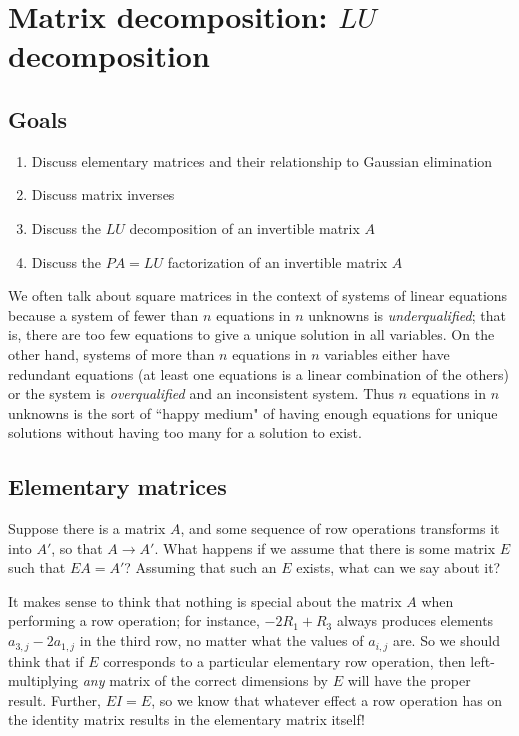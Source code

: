 \documentclass[m3380-lec-main.tex]{subfiles}
\begin{document}
\chapter{Matrix decomposition: $LU$ decomposition}

\section*{Goals}
\begin{enumerate}[1.~]\setlength{\itemsep}{0pt}
\item Discuss elementary matrices and their relationship to Gaussian elimination
\item Discuss matrix inverses
\item Discuss the $LU$ decomposition of an invertible matrix $A$
\item Discuss the $PA=LU$ factorization of an invertible matrix $A$
\end{enumerate}

\begin{rem}We often talk about square matrices in the context of systems of linear equations because a system of fewer than $n$ equations in $n$ unknowns is \emph{underqualified}; that is, there are too few equations to give a unique solution in all variables. On the other hand, systems of more than $n$ equations in $n$ variables either have redundant equations (at least one equations is a linear combination of the others) or the system is \emph{overqualified} and an inconsistent system. Thus $n$ equations in $n$ unknowns is the sort of ``happy medium" of having enough equations for unique solutions without having too many for a solution to exist.\end{rem}

\section{Elementary matrices}

Suppose there is a matrix $A$, and some sequence of row operations transforms it into $A'$, so that $A\to A'$. What happens if we assume that there is some matrix $E$ such that $EA=A'$? Assuming that such an $E$ exists, what can we say about it? 

It makes sense to think that nothing is special about the matrix $A$ when performing a row operation; for instance, $-2R_1+R_3$ always produces elements $a_{3,j}-2a_{1,j}$ in the third row, no matter what the values of $a_{i,j}$ are. So we should think that if $E$ corresponds to a particular elementary row operation, then left-multiplying \emph{any} matrix of the correct dimensions by $E$ will have the proper result. Further, $EI = E$, so we know that whatever effect a row operation has on the identity matrix results in the elementary matrix itself!
\end{document}
